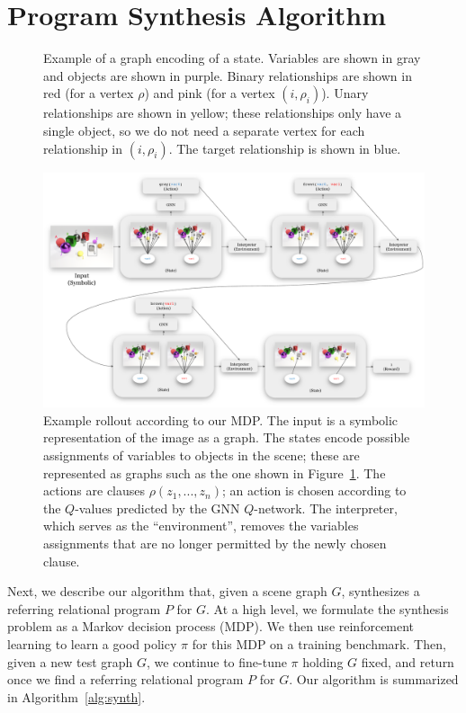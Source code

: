 \section{Program Synthesis Algorithm}

\begin{figure}[t]
\centering

\caption{Example of a graph encoding of a state. Variables are shown in gray and objects are shown in purple. Binary relationships are shown in red (for a vertex $\rho$) and pink (for a vertex $(i,\rho_i)$). Unary relationships are shown in yellow; these relationships only have a single object, so we do not need a separate vertex for each relationship in $(i,\rho_i)$. The target relationship is shown in blue.}
\label{fig:graph}
\end{figure}

\begin{figure}[t]
\centering
\includegraphics[width=\textwidth]{overview.pdf}
\caption{Example rollout according to our MDP. The input is a symbolic representation of the image as a graph. The states encode possible assignments of variables to objects in the scene; these are represented as graphs such as the one shown in Figure~\ref{fig:graph}. The actions are clauses $\rho(z_1,...,z_n)$; an action is chosen according to the $Q$-values predicted by the GNN $Q$-network. The interpreter, which serves as the ``environment'', removes the variables assignments that are no longer permitted by the newly chosen clause.}
\label{fig:mdp}
\end{figure}

Next, we describe our algorithm that, given a scene graph $G$, synthesizes a referring relational program $P$ for $G$. At a high level, we formulate the synthesis problem as a Markov decision process (MDP). We then use reinforcement learning to learn a good policy $\pi$ for this MDP on a training benchmark. Then, given a new test graph $G$, we continue to fine-tune $\pi$ holding $G$ fixed, and return once we find a referring relational program $P$ for $G$. Our algorithm is summarized in Algorithm~\ref{alg:synth}.

